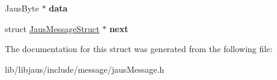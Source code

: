 \begin{DoxyCompactItemize}
\item 
\hypertarget{struct_jaus_message_struct_ada7193712343dfe18a51e6a29c49abcd}{\-Jaus\-Byte $\ast$ {\bfseries data}}\label{struct_jaus_message_struct_ada7193712343dfe18a51e6a29c49abcd}

\item 
\hypertarget{struct_jaus_message_struct_a8bac91ad87b2b7331999e86ad1866d26}{struct \hyperlink{struct_jaus_message_struct}{\-Jaus\-Message\-Struct} $\ast$ {\bfseries next}}\label{struct_jaus_message_struct_a8bac91ad87b2b7331999e86ad1866d26}

\end{DoxyCompactItemize}


\-The documentation for this struct was generated from the following file\-:\begin{DoxyCompactItemize}
\item 
lib/libjaus/include/message/jaus\-Message.\-h\end{DoxyCompactItemize}
